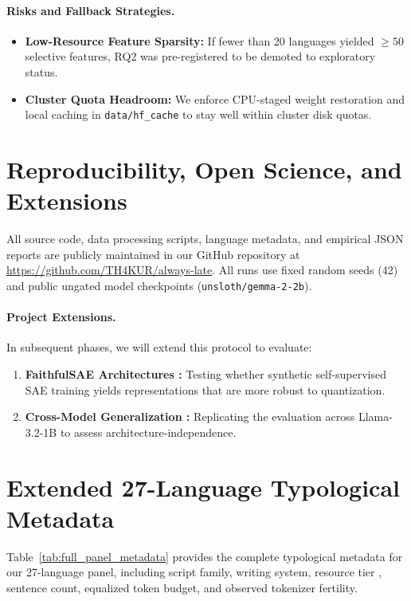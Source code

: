 \documentclass[11pt]{article}
\begin{document}
\paragraph{Risks and Fallback Strategies.}
\begin{itemize}
    \item \textbf{Low-Resource Feature Sparsity:} If fewer than 20 languages yielded $\ge 50$ selective features, RQ2 was pre-registered to be demoted to exploratory status. %
    \item \textbf{Cluster Quota Headroom:} We enforce CPU-staged weight restoration and local caching in \texttt{data/hf\_cache} to stay well within cluster disk quotas.
\end{itemize}

\section{Reproducibility, Open Science, and Extensions}
All source code, data processing scripts, language metadata, and empirical JSON reports are publicly maintained in our GitHub repository at \url{https://github.com/TH4KUR/always-late}. All runs use fixed random seeds (42) and public ungated model checkpoints (\texttt{unsloth/gemma-2-2b}). 

\paragraph{Project Extensions.}
In subsequent phases, we will extend this protocol to evaluate:
\begin{enumerate}
    \item \textbf{FaithfulSAE Architectures \citep{cho2025faithfulsae}:} Testing whether synthetic self-supervised SAE training yields representations that are more robust to quantization.
    \item \textbf{Cross-Model Generalization \citep{he2024llama}:} Replicating the evaluation across Llama-3.2-1B to assess architecture-independence.
\end{enumerate}




\clearpage
\appendix
\section{Extended 27-Language Typological Metadata}
\label{sec:appendix_panel}
Table~\ref{tab:full_panel_metadata} provides the complete typological metadata for our 27-language panel, including script family, writing system, resource tier \citep{joshi2020state}, sentence count, equalized token budget, and observed tokenizer fertility.
\end{document}
